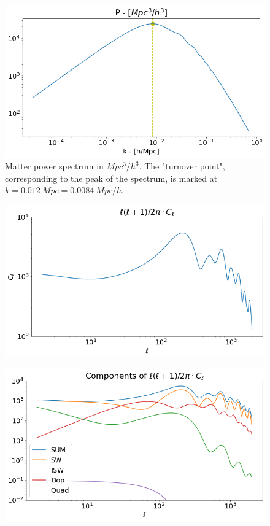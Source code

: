\documentclass[10pt, a4paper]{article}
\begin{document}
\begin{figure}[h!]
    \centering
    \includegraphics[scale=0.5]{../m4_figs/MatterPower.png}
    \caption{Matter power spectrum in $Mpc^3/h^3$. The "turnover point", corresponding to the peak of the spectrum, is marked at $k=\SI{0.012}{Mpc} = \SI{0.0084}{Mpc/h}$.}
    \label{fig:MatterPower}
\end{figure}


\begin{figure}[h!]
    \centering
    \includegraphics[scale=0.5]{../m4_figs/Cell.png}
    \caption{}
    \label{}
\end{figure}

\begin{figure}[h!]
    \centering
    \includegraphics[scale=0.5]{../m4_figs/Cell_all.png}
    \caption{}
    \label{}
\end{figure}
\end{document}
